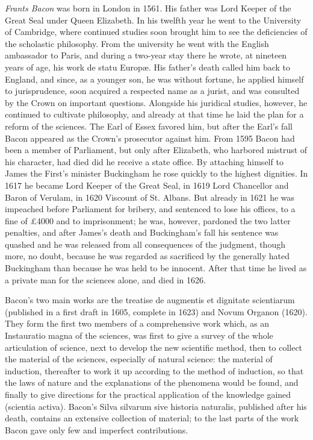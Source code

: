 \emph{Frants Bacon} was born in London in 1561. His father
was Lord Keeper of the Great Seal under Queen Elizabeth. In his twelfth year
he went to the University of Cambridge, where continued studies
soon brought him to see the deficiencies of the scholastic
philosophy. From the university he went with the English ambassador to Paris, and during a two-year stay there he wrote,
at nineteen years of age, his work de statu Europæ. His father's
death called him back to England, and since, as a younger
son, he was without fortune, he applied himself to jurisprudence,
soon acquired a respected name as a jurist, and was
consulted by the Crown on important questions. Alongside his
juridical studies, however, he continued to cultivate philosophy,
and already at that time he laid the plan for a reform of the sciences. The Earl of Essex favored him, but after the Earl's fall Bacon appeared as the Crown's prosecutor against him.
From 1595 Bacon had been a member of Parliament, but
only after Elizabeth, who harbored mistrust of his character, had died did he receive a state office. By attaching himself
to James the First's minister Buckingham he rose quickly
to the highest dignities. In 1617 he became Lord Keeper of the Great Seal,
in 1619 Lord Chancellor and Baron of Verulam, in 1620 Viscount of St.
Albans. But already in 1621 he was impeached before Parliament
for bribery, and sentenced to lose his offices, to a
fine of £4000 and to imprisonment; he was, however, pardoned
the two latter penalties, and after James's death and Buckingham's
fall his sentence was quashed and he was released from all consequences
of the judgment, though more, no doubt, because he was regarded as
sacrificed by the generally hated Buckingham than because
he was held to be innocent. After that time he lived
as a private man for the sciences alone, and died in 1626.

Bacon's two main works are the treatise de augmentis et dignitate scientiarum (published in a first draft in 1605, complete in
1623) and Novum Organon (1620). They form the first two members
of a comprehensive work which, as an Instauratio
magna of the sciences, was first to give a survey of the whole
articulation of science, next to develop the new scientific method,
then to collect the material of the sciences, especially of natural science: the material of induction, thereafter to work it up according to the method of induction, so that the laws of nature and the explanations of the phenomena
would be found, and finally to give directions for the practical application of the knowledge gained (scientia activa). Bacon's Silva silvarum sive historia naturalis, published after
his death, contains an extensive collection of material; to the last parts of
the work Bacon gave only few and imperfect contributions.

